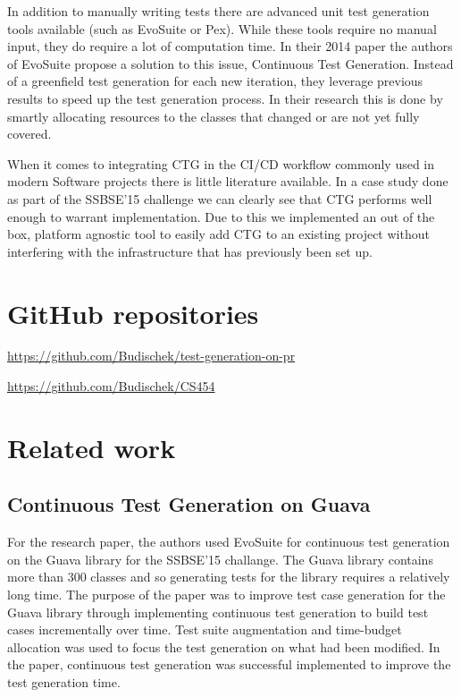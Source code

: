 \documentclass[12pt, a4paper]{article}
\begin{document}
In addition to manually writing tests there are advanced unit test generation tools available (such as EvoSuite or Pex). While these tools require no manual input, they do require a lot of computation time. In their 2014 paper \cite{campos_continuous_2014} the authors of EvoSuite propose a solution to this issue, Continuous Test Generation. Instead of a greenfield test generation for each new iteration, they leverage previous results to speed up the test generation process. In their research this is done by smartly allocating resources to the classes that changed or are not yet fully covered.

When it comes to integrating CTG in the CI/CD workflow commonly used in modern Software projects there is little literature available. In a case study done as part of the SSBSE'15 challenge \cite{barros_continuous_2015} we can clearly see that CTG performs well enough to warrant implementation. Due to this we implemented an out of the box, platform agnostic tool to easily add CTG to an existing project without interfering with the infrastructure that has previously been set up.



\section{GitHub repositories}
\url{https://github.com/Budischek/test-generation-on-pr}

\url{https://github.com/Budischek/CS454}



\section{Related work}
\subsection{Continuous Test Generation on Guava}
For the \cite{barros_continuous_2015} research paper, the authors used EvoSuite for continuous test generation on the Guava library for the SSBSE'15 challange. The Guava library contains more than 300 classes and so generating tests for the library requires a relatively long time. The purpose of the paper was to improve test case generation for the Guava library through implementing continuous test generation to build test cases incrementally over time. Test suite augmentation and time-budget allocation was used to focus the test generation on what had been modified. In the paper, continuous test generation was successful implemented to improve the test generation time.
\end{document}
